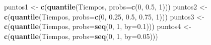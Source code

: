 \documentclass[10pt,]{krantz}
\makeatletter
\newenvironment{Shaded}{\begin{snugshade}}{\end{snugshade}}
\newcommand{\KeywordTok}[1]{\textcolor[rgb]{0.13,0.29,0.53}{\textbf{#1}}}
\newcommand{\DataTypeTok}[1]{\textcolor[rgb]{0.13,0.29,0.53}{#1}}
\newcommand{\DecValTok}[1]{\textcolor[rgb]{0.00,0.00,0.81}{#1}}
\newcommand{\FloatTok}[1]{\textcolor[rgb]{0.00,0.00,0.81}{#1}}
\newcommand{\StringTok}[1]{\textcolor[rgb]{0.31,0.60,0.02}{#1}}
\newcommand{\NormalTok}[1]{#1}
\newenvironment{kframe}{%
\medskip{}
\setlength{\fboxsep}{.8em}
 \def\at@end@of@kframe{}%
 \ifinner\ifhmode%
  \def\at@end@of@kframe{\end{minipage}}%
  \begin{minipage}{\columnwidth}%
 \fi\fi%
 \def\FrameCommand##1{\hskip\@totalleftmargin \hskip-\fboxsep
 \colorbox{shadecolor}{##1}\hskip-\fboxsep
     \hskip-\linewidth \hskip-\@totalleftmargin \hskip\columnwidth}%
 \MakeFramed {\advance\hsize-\width
   \@totalleftmargin\z@ \linewidth\hsize
   \@setminipage}}%
 {\par\unskip\endMakeFramed%
 \at@end@of@kframe}
\renewenvironment{Shaded}{\begin{kframe}}{\end{kframe}}
\makeatother
\begin{document}
\begin{Shaded}
\begin{Highlighting}[]
\NormalTok{puntos1 <-}\StringTok{ }\KeywordTok{c}\NormalTok{(}\KeywordTok{quantile}\NormalTok{(Tiempos, }\DataTypeTok{probs=}\KeywordTok{c}\NormalTok{(}\DecValTok{0}\NormalTok{, }\FloatTok{0.5}\NormalTok{, }\DecValTok{1}\NormalTok{)))}
\NormalTok{puntos2 <-}\StringTok{ }\KeywordTok{c}\NormalTok{(}\KeywordTok{quantile}\NormalTok{(Tiempos, }\DataTypeTok{probs=}\KeywordTok{c}\NormalTok{(}\DecValTok{0}\NormalTok{, }\FloatTok{0.25}\NormalTok{, }\FloatTok{0.5}\NormalTok{, }\FloatTok{0.75}\NormalTok{, }\DecValTok{1}\NormalTok{)))}
\NormalTok{puntos3 <-}\StringTok{ }\KeywordTok{c}\NormalTok{(}\KeywordTok{quantile}\NormalTok{(Tiempos, }\DataTypeTok{probs=}\KeywordTok{seq}\NormalTok{(}\DecValTok{0}\NormalTok{, }\DecValTok{1}\NormalTok{, }\DataTypeTok{by=}\FloatTok{0.1}\NormalTok{)))}
\NormalTok{puntos4 <-}\StringTok{ }\KeywordTok{c}\NormalTok{(}\KeywordTok{quantile}\NormalTok{(Tiempos, }\DataTypeTok{probs=}\KeywordTok{seq}\NormalTok{(}\DecValTok{0}\NormalTok{, }\DecValTok{1}\NormalTok{, }\DataTypeTok{by=}\FloatTok{0.05}\NormalTok{)))}


\end{Highlighting}
\end{Shaded}
\end{document}
